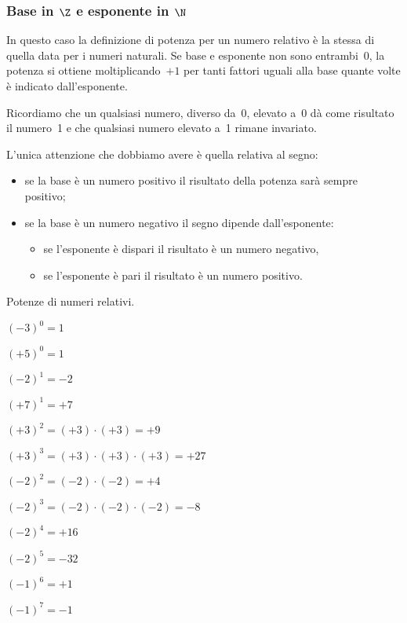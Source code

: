 \subsubsection{Base in \(\Z\) e esponente in \(\N\)}

In questo caso la definizione di potenza per un numero relativo è la stessa 
di quella data per i numeri naturali.
Se base e esponente non sono entrambi~0, la potenza si ottiene 
moltiplicando~\(+1\) per tanti fattori uguali alla base quante volte è 
indicato dall'esponente.

Ricordiamo che un qualsiasi numero, diverso da~0, elevato a~0 dà come 
risultato il numero~1 e che qualsiasi numero elevato a~1 rimane invariato.

L'unica attenzione che dobbiamo avere è quella relativa al segno:
\begin{itemize} [nosep]
\item se la base è un numero positivo il risultato della potenza sarà 
sempre positivo;
\item se la base è un numero negativo il segno dipende dall'esponente: 
\begin{itemize} [nosep]
\item se l'esponente è dispari il risultato è un numero negativo,
\item se l'esponente è pari il risultato è un numero positivo.
\end{itemize}
\end{itemize}

\begin{esempio}{}{}
Potenze di numeri relativi.
\begin{multicols}{2}
\begin{itemize*}
\item \((-3)^0=1\)
\item \((+5)^0=1\) 
\item \((-2)^1=-2\) 
\item \((+7)^1=+7\) 
\item \((+3)^2=(+3)\cdot(+3)=+9\)
\item \((+3)^3=(+3)\cdot(+3)\cdot(+3)=+27\)
\item \((-2)^2=(-2)\cdot(-2)=+4\)
\item \((-2)^3=(-2)\cdot(-2)\cdot(-2)=-8\)
\item \((-2)^4=+16\)
\item \((-2)^5=-32\)
\item \((-1)^6=+1\)
\item \((-1)^7=-1\)
\end{itemize*}
\end{multicols}
\end{esempio}

